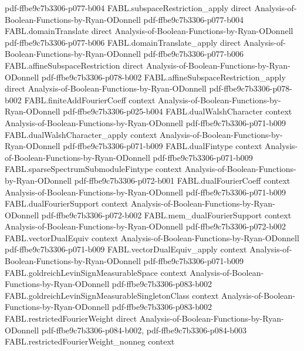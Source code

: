 \begin{theorem}
  {pdf-ffbe9c7b3306-p077-b004}
\proofstep
  {FABL.subspaceRestriction_apply}
  {direct}
  {Analysis-of-Boolean-Functions-by-Ryan-ODonnell}
  {pdf-ffbe9c7b3306-p077-b004}
\proofstep
  {FABL.domainTranslate}
  {direct}
  {Analysis-of-Boolean-Functions-by-Ryan-ODonnell}
  {pdf-ffbe9c7b3306-p077-b006}
\proofstep
  {FABL.domainTranslate_apply}
  {direct}
  {Analysis-of-Boolean-Functions-by-Ryan-ODonnell}
  {pdf-ffbe9c7b3306-p077-b006}
\proofstep
  {FABL.affineSubspaceRestriction}
  {direct}
  {Analysis-of-Boolean-Functions-by-Ryan-ODonnell}
  {pdf-ffbe9c7b3306-p078-b002}
\proofstep
  {FABL.affineSubspaceRestriction_apply}
  {direct}
  {Analysis-of-Boolean-Functions-by-Ryan-ODonnell}
  {pdf-ffbe9c7b3306-p078-b002}
\proofstep
  {FABL.finiteAddFourierCoeff}
  {context}
  {Analysis-of-Boolean-Functions-by-Ryan-ODonnell}
  {pdf-ffbe9c7b3306-p025-b004}
\proofstep
  {FABL.dualWalshCharacter}
  {context}
  {Analysis-of-Boolean-Functions-by-Ryan-ODonnell}
  {pdf-ffbe9c7b3306-p071-b009}
\proofstep
  {FABL.dualWalshCharacter_apply}
  {context}
  {Analysis-of-Boolean-Functions-by-Ryan-ODonnell}
  {pdf-ffbe9c7b3306-p071-b009}
\proofstep
  {FABL.dualFintype}
  {context}
  {Analysis-of-Boolean-Functions-by-Ryan-ODonnell}
  {pdf-ffbe9c7b3306-p071-b009}
\proofstep
  {FABL.sparseSpectrumSubmoduleFintype}
  {context}
  {Analysis-of-Boolean-Functions-by-Ryan-ODonnell}
  {pdf-ffbe9c7b3306-p072-b001}
\proofstep
  {FABL.dualFourierCoeff}
  {context}
  {Analysis-of-Boolean-Functions-by-Ryan-ODonnell}
  {pdf-ffbe9c7b3306-p071-b009}
\proofstep
  {FABL.dualFourierSupport}
  {context}
  {Analysis-of-Boolean-Functions-by-Ryan-ODonnell}
  {pdf-ffbe9c7b3306-p072-b002}
\proofstep
  {FABL.mem_dualFourierSupport}
  {context}
  {Analysis-of-Boolean-Functions-by-Ryan-ODonnell}
  {pdf-ffbe9c7b3306-p072-b002}
\proofstep
  {FABL.vectorDualEquiv}
  {context}
  {Analysis-of-Boolean-Functions-by-Ryan-ODonnell}
  {pdf-ffbe9c7b3306-p071-b009}
\proofstep
  {FABL.vectorDualEquiv_apply}
  {context}
  {Analysis-of-Boolean-Functions-by-Ryan-ODonnell}
  {pdf-ffbe9c7b3306-p071-b009}
\proofstep
  {FABL.goldreichLevinSignMeasurableSpace}
  {context}
  {Analysis-of-Boolean-Functions-by-Ryan-ODonnell}
  {pdf-ffbe9c7b3306-p083-b002}
\proofstep
  {FABL.goldreichLevinSignMeasurableSingletonClass}
  {context}
  {Analysis-of-Boolean-Functions-by-Ryan-ODonnell}
  {pdf-ffbe9c7b3306-p083-b002}
\proofstep
  {FABL.restrictedFourierWeight}
  {direct}
  {Analysis-of-Boolean-Functions-by-Ryan-ODonnell}
  {pdf-ffbe9c7b3306-p084-b002,
    pdf-ffbe9c7b3306-p084-b003}
\proofstep
  {FABL.restrictedFourierWeight_nonneg}
  {context}

\end{theorem}
